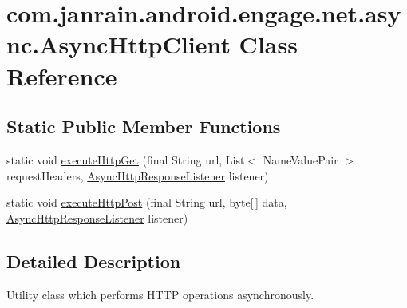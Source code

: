\hypertarget{classcom_1_1janrain_1_1android_1_1engage_1_1net_1_1async_1_1_async_http_client}{
\section{com.janrain.android.engage.net.async.AsyncHttpClient Class Reference}
\label{classcom_1_1janrain_1_1android_1_1engage_1_1net_1_1async_1_1_async_http_client}
}
\subsection*{Static Public Member Functions}
\begin{DoxyCompactItemize}
\item 
static void \hyperlink{classcom_1_1janrain_1_1android_1_1engage_1_1net_1_1async_1_1_async_http_client_a561675e60a1d07eb476ffe4c4333f716}{executeHttpGet} (final String url, List$<$ NameValuePair $>$ requestHeaders, \hyperlink{interfacecom_1_1janrain_1_1android_1_1engage_1_1net_1_1async_1_1_async_http_response_listener}{AsyncHttpResponseListener} listener)
\item 
static void \hyperlink{classcom_1_1janrain_1_1android_1_1engage_1_1net_1_1async_1_1_async_http_client_abc7d1b2016c665a9a498c1bd3dc7b850}{executeHttpPost} (final String url, byte\mbox{[}$\,$\mbox{]} data, \hyperlink{interfacecom_1_1janrain_1_1android_1_1engage_1_1net_1_1async_1_1_async_http_response_listener}{AsyncHttpResponseListener} listener)
\end{DoxyCompactItemize}


\subsection{Detailed Description}
Utility class which performs HTTP operations asynchronously. 

